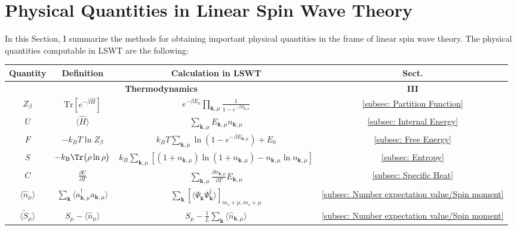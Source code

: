 \section{Physical Quantities in Linear Spin Wave Theory}

In this Section, I summarize the methods for obtaining important physical quantities in the frame of linear spin wave theory.
The physical quantities computable in LSWT are the following:


\begin{table}[!h]
    \centering
    \begin{tabular}{c|c|c|c}
    \hline\hline
    \textbf{Quantity} & \textbf{Definition} & \textbf{Calculation in LSWT} & \textbf{Sect.} \\
    \hline
    \multicolumn{3}{c|}{\bf Thermodynamics} & \textbf{III} \\[0.5ex]
    \hline
    $Z_{\beta}$ %
    & 
    $\text{Tr} [e^{-\beta \hat{H}}]$ 
    & $e^{-\beta E_{0}} \prod_{\mathbf{k}, \mu} \frac{1}{1 - e^{-\beta E_{\mathbf{k}, \mu}}}$ 
    & \ref{subsec: Partition Function}
    \\[1ex]
    $U$ 
    & $\langle \hat{H} \rangle$ & $\sum_{\mathbf{k}, \mu} E_{\mathbf{k}, \mu} n_{\mathbf{k}, \mu}$
    & \ref{subsec: Internal Energy}
    \\[1ex]
    $F$ 
    & $- k_B T \ln Z_{\beta}$ 
    & $  k_B T \sum_{\mathbf{k}, \mu} \ln \left( 1 - e^{-\beta E_{\mathbf{k}, \mu}} \right) + E_{0} $ 
    & \ref{subsec: Free Energy}
    \\[1ex]
    $S$ 
    & $-k_{\rm B}\Tr \big( \rho \ln \rho \big)$
    & $k_B \sum_{\mathbf{k}, \mu} \left[ (1 + n_{\mathbf{k}, \mu}) \ln (1 + n_{\mathbf{k}, \mu}) - n_{\mathbf{k}, \mu} \ln n_{\mathbf{k}, \mu} \right]$ 
    & \ref{subsec: Entropy}
    \\[1ex]
    $C$ 
    & $\frac{\partial U}{\partial T}$ 
    & $\sum_{\mathbf{k}, \mu} \frac{\partial n_{\mathbf{k}, \mu}}{\partial T} E_{\mathbf{k}, \mu}$ 
    & \ref{subsec: Specific Heat} 
    \\[1ex]
    $\langle \hat{n}_\mu \rangle$ 
    & $\sum_{\mathbf{k}} \langle a^{\dagger}_{\mathbf{k}, \mu} a_{\mathbf{k}, \mu} \rangle$  
    & $\sum_{\mathbf{k}} [\langle \Psi_{\mathbf{k}}^{\phantom\dagger} \Psi_{\mathbf{k}}^{\dagger} \rangle]_{m_{s} + \mu, m_{s} + \mu}$ 
    & \ref{subsec: Number expectation value/Spin moment} \\
    [1ex]
    $\langle \widetilde{S}_\mu \rangle$ 
    & $S_{\mu} - \langle \hat{n}_\mu \rangle$  
    & $S_{\mu} - \frac{1}{L} \sum_{\mathbf{k}} \langle \hat{n}_{\mathbf{k}, \mu} \rangle$ & \ref{subsec: Number expectation value/Spin moment} \\

\end{tabular}
\end{table}
